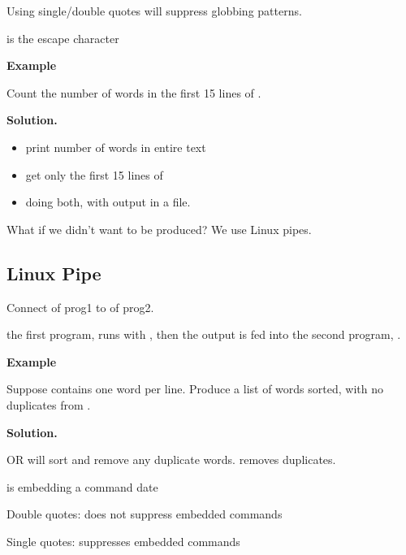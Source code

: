 Using single/double quotes will suppress globbing patterns.

\code{\textbackslash} is the escape character

\textbf{Example}

Count the number of words in the first 15 lines of .

\textbf{Solution.}

\begin{itemize}
    \item {} \textrightarrow{} print number of words in entire text
    \item {} \textrightarrow{} get only the first 15 lines
          of 
    \item {} \textrightarrow{}
          doing both, with output in a  file.
\end{itemize}

What if we didn't want  to be produced? We use Linux pipes.

\subsection{Linux Pipe}
Connect  of prog1 to  of prog2.

 \textrightarrow{}
the first program,  runs with , then the output is fed into
the second program, .

\textbf{Example}

Suppose  contains one word per line. Produce
a list of words sorted, with no duplicates from .

\textbf{Solution.}

 OR
 \textrightarrow{}  will sort
and remove any duplicate words.  removes duplicates.

 \textrightarrow{}
 is embedding a command date

Double quotes: does not suppress embedded commands

Single quotes: suppresses embedded commands
